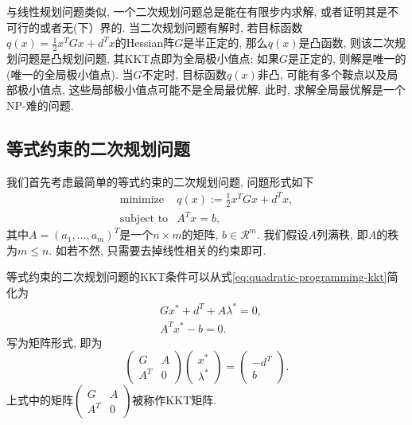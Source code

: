 \documentclass{SBCbookchapter}
\newcommand{\R}{\mathcal{R}}
\begin{document}
与线性规划问题类似, 一个二次规划问题总是能在有限步内求解, 或者证明其是不可行的或者无(下）界的. 当二次规划问题有解时, 若目标函数$q(x) = \frac{1}{2} x^T G x + d^T x$的Hessian阵$G$是半正定的, 那么$q(x)$是凸函数, 则该二次规划问题是凸规划问题, 其KKT点即为全局极小值点; 如果$G$是正定的, 则解是唯一的(唯一的全局极小值点). 当$G$不定时, 目标函数$q(x)$非凸, 可能有多个鞍点以及局部极小值点, 这些局部极小值点可能不是全局最优解. 此时, 求解全局最优解是一个NP-难的问题\cite{Murty_1987}.


\subsection{等式约束的二次规划问题}
\label{subsec:7.2.1}

我们首先考虑最简单的等式约束的二次规划问题, 问题形式如下
\begin{equation}
\label{eq:quadratic-programming-eq-constrained}
\begin{array}{cl}
\text{minimize} & q(x) := \frac{1}{2} x^T G x + d^T x, \\
\text{subject to} & A^T x = b,
\end{array}
\end{equation}
其中$A = (a_1, \ldots, a_m)^T$是一个$n \times m$的矩阵, $b\in \R^m.$ 我们假设$A$列满秩, 即$A$的秩为$m \leqslant n.$ 如若不然, 只需要去掉线性相关的约束即可.

等式约束的二次规划问题的KKT条件可以从式\eqref{eq:quadratic-programming-kkt}简化为
\begin{equation}
\label{eq:quadratic-programming-kkt-2}
\begin{aligned}
& G x^* + d^T + A \lambda^* = 0, \\
& A^T x^* - b = 0.
\end{aligned}
\end{equation}
写为矩阵形式, 即为
\begin{equation}
\label{eq:quadratic-programming-kkt-2-mat}
\begin{pmatrix} G & A \\ A^T & 0 \end{pmatrix} \begin{pmatrix} x^* \\ \lambda^* \end{pmatrix} = \begin{pmatrix} -d^T \\ b \end{pmatrix}.
\end{equation}
上式中的矩阵$\begin{pmatrix} G & A \\ A^T & 0 \end{pmatrix}$被称作KKT矩阵.
\end{document}
